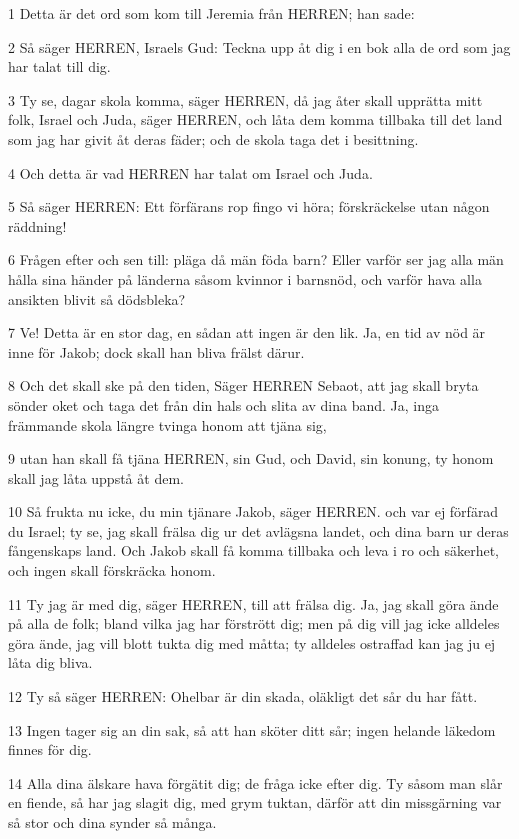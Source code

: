 \par 1 Detta är det ord som kom till Jeremia från HERREN; han sade:
\par 2 Så säger HERREN, Israels Gud: Teckna upp åt dig i en bok alla de ord som jag har talat till dig.
\par 3 Ty se, dagar skola komma, säger HERREN, då jag åter skall upprätta mitt folk, Israel och Juda, säger HERREN, och låta dem komma tillbaka till det land som jag har givit åt deras fäder; och de skola taga det i besittning.
\par 4 Och detta är vad HERREN har talat om Israel och Juda.
\par 5 Så säger HERREN: Ett förfärans rop fingo vi höra; förskräckelse utan någon räddning!
\par 6 Frågen efter och sen till: pläga då män föda barn? Eller varför ser jag alla män hålla sina händer på länderna såsom kvinnor i barnsnöd, och varför hava alla ansikten blivit så dödsbleka?
\par 7 Ve! Detta är en stor dag, en sådan att ingen är den lik. Ja, en tid av nöd är inne för Jakob; dock skall han bliva frälst därur.
\par 8 Och det skall ske på den tiden, Säger HERREN Sebaot, att jag skall bryta sönder oket och taga det från din hals och slita av dina band. Ja, inga främmande skola längre tvinga honom att tjäna sig,
\par 9 utan han skall få tjäna HERREN, sin Gud, och David, sin konung, ty honom skall jag låta uppstå åt dem.
\par 10 Så frukta nu icke, du min tjänare Jakob, säger HERREN. och var ej förfärad du Israel; ty se, jag skall frälsa dig ur det avlägsna landet, och dina barn ur deras fångenskaps land. Och Jakob skall få komma tillbaka och leva i ro och säkerhet, och ingen skall förskräcka honom.
\par 11 Ty jag är med dig, säger HERREN, till att frälsa dig. Ja, jag skall göra ände på alla de folk; bland vilka jag har förstrött dig; men på dig vill jag icke alldeles göra ände, jag vill blott tukta dig med måtta; ty alldeles ostraffad kan jag ju ej låta dig bliva.
\par 12 Ty så säger HERREN: Ohelbar är din skada, oläkligt det sår du har fått.
\par 13 Ingen tager sig an din sak, så att han sköter ditt sår; ingen helande läkedom finnes för dig.
\par 14 Alla dina älskare hava förgätit dig; de fråga icke efter dig. Ty såsom man slår en fiende, så har jag slagit dig, med grym tuktan, därför att din missgärning var så stor och dina synder så många.
